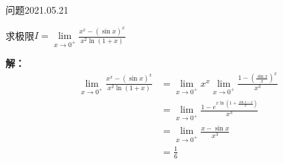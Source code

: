 \begin{mybox}{问题2021.05.21}
	
	\qquad 求极限$I=\lim\limits_{x\to 0^{+}} \frac{x^x -(\sin x)^x}{x^2\ln(1+x)}$
\end{mybox}
\noindent
\textbf{解：}
\begin{align*}
	\lim\limits_{x\to 0^{+}} \frac{x^x -(\sin x)^x}{x^2\ln(1+x)}&=
	\lim\limits_{x\to 0^{+}} x^x \lim\limits_{x\to 0^{+}} \frac{1-(\frac{\sin x}{x})^x}{x^3}\\
	&=\lim\limits_{x\to 0^{+}} \frac{1-e^{x\ln(1+\frac{\sin x - x}{x})}}{x^3}\\
	&=\lim\limits_{x\to 0^{+}} \frac{x-\sin x}{x^3}\\
	&=\frac{1}{6}
\end{align*}